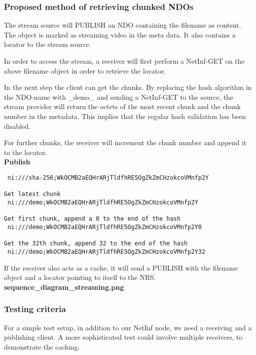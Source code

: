\documentclass[11pt]{report}
\begin{document}
\subsubsection{Proposed method of retrieving chunked NDOs}

The stream source will PUBLISH an NDO containing the filename as content. The object is marked as streaming video in the meta data. It also contains a locator to the stream source.

In order to access the stream, a receiver will first perform a NetInf-GET on the above filename object in order to retrieve the locator. 

In the next step the client can get the chunks. By replacing the hash algorithm in the NDO-name with \_demo\_ and sending a NetInf-GET to the source, the stream provider will return the octets of the most recent chunk and the chunk number in the metadata. This implies that the regular hash validation has been disabled.

For further chunks, the receiver will increment the chunk number and append it to the locator.\\

\textbf{Publish}\\
\begin{verbatim}
 ni:///sha-256;WkOCMB2aEQHrARjTldfhRE5OgZkZmCHzokcoVMnfp2Y

Get latest chunk
 ni:///demo;WkOCMB2aEQHrARjTldfhRE5OgZkZmCHzokcoVMnfp2Y

Get first chunk, append a 0 to the end of the hash
 ni:///demo;WkOCMB2aEQHrARjTldfhRE5OgZkZmCHzokcoVMnfp2Y0

Get the 32th chunk, append 32 to the end of the hash
 ni:///demo;WkOCMB2aEQHrARjTldfhRE5OgZkZmCHzokcoVMnfp2Y32
\end{verbatim}
 
If the receiver also acts as a cache, it will send a PUBLISH with the filename object and a locator pointing to itself to the NRS.
\\

\textbf{sequence\_diagram\_streaming.png}

\subsubsection{Testing criteria} 

For a simple test setup, in addition to our NetInf node, we need a receiving and a publishing client. A more sophisticated test could involve multiple receivers, to demonstrate the caching.
\end{document}
